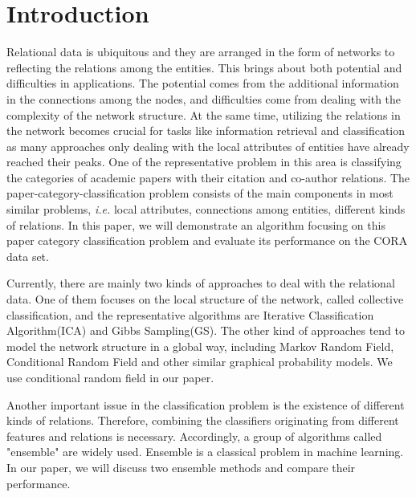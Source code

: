 \documentclass{sig-alternate}
\begin{document}

\section{Introduction}
Relational data is ubiquitous and they are arranged in the form of networks to reflecting the relations among the entities. This brings about both potential and difficulties in applications. The potential comes from the additional information in the connections among the nodes, and difficulties come from dealing with the complexity of the network structure. At the same time, utilizing the relations in the network becomes crucial for tasks like information retrieval and classification as many approaches only dealing with the local attributes of entities have already reached their peaks. One of the representative problem in this area is classifying the categories of academic papers with their citation and co-author relations. The paper-category-classification problem consists of the main components in most similar problems, \emph{i.e.} local attributes, connections among entities, different kinds of relations. In this paper, we will demonstrate an algorithm focusing on this paper category classification problem and evaluate its performance on the CORA\cite{Mccallum2000Automating} data set.

Currently, there are mainly two kinds of approaches to deal with the relational data. One of them focuses on the local structure of the network, called collective classification\cite{Jensen2004Why}, and the representative algorithms are Iterative Classification Algorithm(ICA)\cite{Neville2000J} and Gibbs Sampling(GS)\cite{gilks1995markov}. The other kind of approaches tend to model the network structure in a global way, including Markov Random Field\cite{Taskar2003Link}, Conditional Random Field\cite{Getoor2010An} and other similar graphical probability models. We use conditional random field in our paper.

Another important issue in the classification problem is the existence of different kinds of relations. Therefore, combining the classifiers originating from different features and relations is necessary. Accordingly, a group of algorithms called "ensemble" are widely used. Ensemble is a classical problem in machine learning\cite{Dietterich2000Ensemble}. In our paper, we will discuss two ensemble methods and compare their performance.
\end{document}
